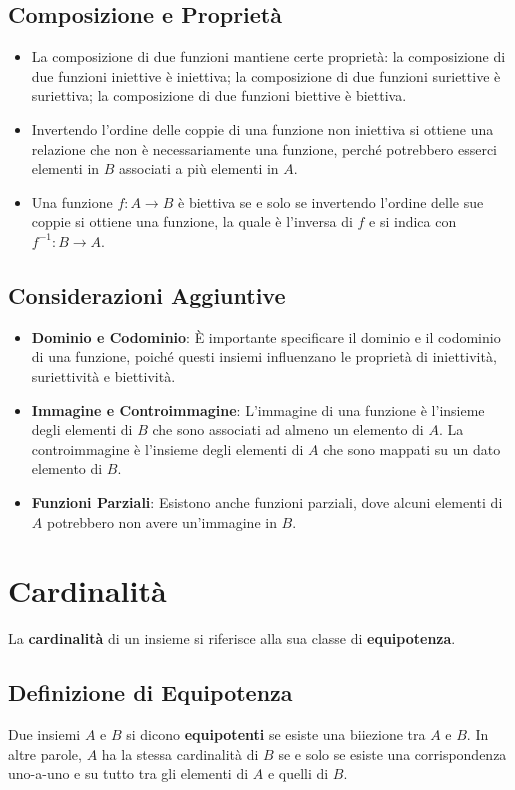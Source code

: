 \documentclass{article}
\begin{document}
\subsection{Composizione e Proprietà}
\begin{itemize}
\item La composizione di due funzioni mantiene certe proprietà: la composizione di due funzioni iniettive è iniettiva; la composizione di due funzioni suriettive è suriettiva; la composizione di due funzioni biettive è biettiva.
\item Invertendo l’ordine delle coppie di una funzione non iniettiva si ottiene una relazione che non è necessariamente una funzione, perché potrebbero esserci elementi in $B$ associati a più elementi in $A$.
\item Una funzione $f: A \rightarrow B$ è biettiva se e solo se invertendo l’ordine delle sue coppie si ottiene una funzione, la quale è l'inversa di $f$ e si indica con $f^{-1}: B \rightarrow A$.
\end{itemize}

\subsection{Considerazioni Aggiuntive}
\begin{itemize}
\item \textbf{Dominio e Codominio}: È importante specificare il dominio e il codominio di una funzione, poiché questi insiemi influenzano le proprietà di iniettività, suriettività e biettività.
\item \textbf{Immagine e Controimmagine}: L'immagine di una funzione è l'insieme degli elementi di $B$ che sono associati ad almeno un elemento di $A$. La controimmagine è l'insieme degli elementi di $A$ che sono mappati su un dato elemento di $B$.
\item \textbf{Funzioni Parziali}: Esistono anche funzioni parziali, dove alcuni elementi di $A$ potrebbero non avere un'immagine in $B$.
\end{itemize}

\newpage
\section{Cardinalità}
La \textbf{cardinalità} di un insieme si riferisce alla sua classe di \textbf{equipotenza}.

\subsection{Definizione di Equipotenza}
Due insiemi $A$ e $B$ si dicono \textbf{equipotenti} se esiste una biiezione tra $A$ e $B$. In altre parole, $A$ ha la stessa cardinalità di $B$ se e solo se esiste una corrispondenza uno-a-uno e su tutto tra gli elementi di $A$ e quelli di $B$.
\end{document}
